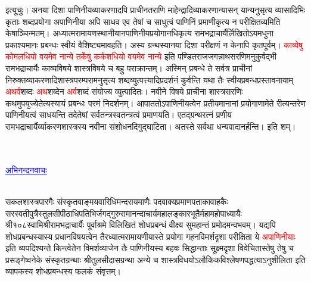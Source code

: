 \begin{sloppypar}\justifying\noindent इत्यूचुः। अनया दिशा पाणिनीय\-व्याकरणादपि प्राचीनतराणि माहेन्द्रादि\-व्याकरणान्यासन् यान्यनुसृत्य व्यासादिभिः कृताः शब्दप्रयोगा अपाणिनीया अपि साधव एव तेषां च साधुत्वं पाणिनिं प्रमाणीकृत्य न परीक्षितव्यमिति केषाञ्चिन्मतम्। अध्यात्म\-रामायण\-स्थानीयानपाणिनीय\-प्रयोगानधिकृत्य रामभद्राचार्यैर्लिखितोऽ\-यमधुना प्रकाश्यमानः प्रबन्धः स्वीयं वैशिष्ट्यमावहति। अस्य ग्रन्थस्यानया दिशा परीक्षणं न केनापि कृतपूर्वम्। \textcolor{red}{काव्येषु कोमलधियो वयमेव नान्ये तर्केषु कर्कशधियो वयमेव नान्ये} इति पण्डितराज\-जगन्नाथ\-सरणिमनुकुर्वद्भी रामभद्राचार्यैः काव्य\-विषये शास्त्र\-विषये च बहु पराक्रान्तम्। अस्मिन् प्रबन्धे ते सर्वत्र प्राचीनां निरुक्त\-व्याकरणादि\-शास्त्र\-परम्परामनुसृत्य शब्द\-व्युत्पत्त्यादिप्रदर्शनं कुर्वन्ति यथा तैः स्वीय\-प्रबन्ध\-प्रस्तावनायाम् \textcolor{red}{अथर्व}\-शब्दः \textcolor{red}{अथ}\-शब्देन \textcolor{red}{अर्व}\-शब्दं संयोज्य व्युत्पादितः। नवीने विषये प्राचीना शास्त्रसरणिः कथमुप\-युज्येतेत्यस्यायं प्रबन्धः परमं निदर्शनम्। आपाततोऽपाणिनीयत्वेन प्रतीयमानानां प्रयोगाणामेते रीत्यन्तरेण पाणिनीयत्वं साधयन्ति तदेतेषां सर्वतन्त्र\-स्वतन्त्रत्वं प्रमाणयति। एतद्ग्रन्थरत्नं प्रणीय रामभद्राचार्यैर्व्याकरण\-शास्त्रस्य नवीना संशोधनदिगुद्घाटिता। अतस्ते सर्वथा धन्यवादानर्हन्ति। इति शम्।\end{sloppypar}
\vspace{4mm}
\fontsize{14}{19}\selectfont
{}\nopagebreak\\
\fontsize{12}{16}\selectfont
{}\\
\vspace{8mm}
\fontsize{18}{27}\selectfont
\centering\textcolor{blue}{\underline{अभिनन्दनवाचः}}\nopagebreak\\
\vspace{4mm}
\fontsize{14}{21}\selectfont
{}\nopagebreak\\
\vspace{4mm}
\fontsize{14}{21}\selectfont
\begin{sloppypar}\justifying\noindent\hspace{10mm} सकल\-शास्त्र\-पारगैः संस्कृत\-वाङ्मय\-वारिधि\-मन्दरायमाणैः पद\-वाक्य\-प्रमाण\-पताका\-वाहकैः सरस्वती\-पुत्रैस्तुलसी\-पीठाधिपतिभिर्जगद्गुरु\-रामानन्दाचार्य\-महालङ्कार\-भूतैर्महा\-महोपाध्यायैः श्री१०८स्वामि\-श्रीरामभद्राचार्यैः पूर्वाश्रमे विलिखितं शोधप्रबन्धं वीक्ष्य सुमहान्तं प्रमोदमन्वभवम्। यद्यपि शोध\-प्रबन्धस्यास्य प्रधान\-विषयत्वेन तैरध्यात्म\-रामायणीयास्ते प्रयोगा गहन\-विमर्श\-दृशा परीक्षिता ये \textcolor{red}{अपाणिनीयाः} इति व्यपदिश्यन्ते किन्त्वेतेन विमर्श\-व्याजेन तैः पाणिनीयस्य बहवः सिद्धान्ताः सूक्ष्मदृशा विवेचितास्तेषु तेषु च प्रसङ्गेष्वनेके संस्कृत\-ग्रन्थाः श्रीतुलसीदास\-ग्रन्था अन्ये च शास्त्र\-विधयोऽलौकिक\-विश्लेषण\-पद्धत्याऽनुशीलिता इति व्यापकस्य शोध\-प्रबन्धस्य फलकं संवृत्तम्।\end{sloppypar}
